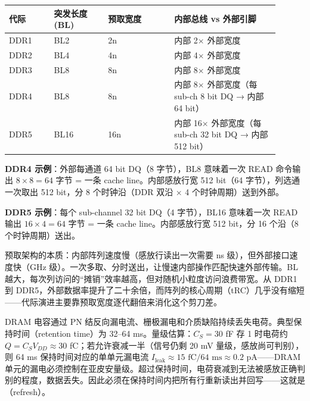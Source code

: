 \begin{longtable}{L{0.15\linewidth}L{0.18\linewidth}L{0.22\linewidth}L{0.35\linewidth}}
\toprule
代际 & 突发长度 (BL) & 预取宽度 & 内部总线 vs 外部引脚 \\
\midrule
DDR1 & BL2 & 2n & 内部 2$\times$ 外部宽度 \\\tablerowrule
DDR2 & BL4 & 4n & 内部 4$\times$ 外部宽度 \\\tablerowrule
DDR3 & BL8 & 8n & 内部 8$\times$ 外部宽度 \\\tablerowrule
DDR4 & BL8 & 8n & 内部 8$\times$ 外部宽度（每 sub-ch 8 bit DQ → 内部 64 bit） \\\tablerowrule
DDR5 & BL16 & 16n & 内部 16$\times$ 外部宽度（每 sub-ch 32 bit DQ → 内部 512 bit） \\
\bottomrule
\end{longtable}

\textbf{DDR4 示例}：外部每通道 64 bit DQ（8 字节），BL8 意味着一次 READ 命令输出 $8 \times 8 = 64$ 字节 = 一条 cache line。内部感放行宽 512 bit（64 字节），列选通一次取出 512 bit，分 8 个时钟沿（DDR 双沿 × 4 个时钟周期）送到外部。

\textbf{DDR5 示例}：每个 sub-channel 32 bit DQ（4 字节），BL16 意味着一次 READ 输出 $16 \times 4 = 64$ 字节 = 一条 cache line。内部感放行宽 512 bit，分 16 个沿（8 个时钟周期）送出。

\begin{keyidea}
预取架构的本质：内部阵列速度慢（感放行读出一次需要 ns 级），但外部接口速度快（GHz 级）。一次多取、分时送出，让慢速内部操作匹配快速外部传输。BL 越大，每次列访问的“摊销”效率越高，但对随机小粒度访问浪费带宽。从 DDR1 到 DDR5，外部数据率提升了二十余倍，而阵列的核心周期（tRC）几乎没有缩短——代际演进主要靠预取宽度逐代翻倍来消化这个剪刀差。
\end{keyidea}


DRAM 电容通过 PN 结反向漏电流、栅极漏电和介质缺陷持续丢失电荷。典型保持时间（retention time）为 32--64 ms。量级估算：$C_S = 30$ fF 存 1 时电荷约 $Q = C_S V_{DD} \approx 30$ fC；若允许衰减一半（信号仍剩 20 mV 量级，感放尚可判别），则 64 ms 保持时间对应的单单元漏电流 $I_{\text{leak}} \approx 15\text{ fC} / 64\text{ ms} \approx 0.2$ pA——DRAM 单元的漏电必须控制在亚皮安量级。超过保持时间，电荷衰减到无法被感放正确判别的程度，数据丢失。因此必须在保持时间内把所有行重新读出并回写——这就是（refresh）。


